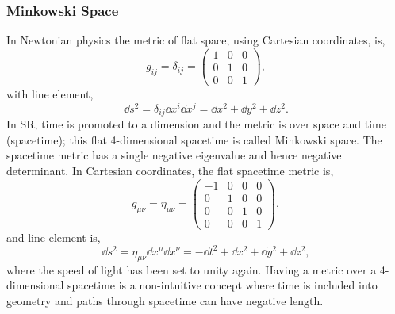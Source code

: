 \subsubsection{Minkowski Space}\label{intro:sec:minkowski_space}
In Newtonian physics the metric of flat space, using Cartesian coordinates, is, 
\begin{equation}
g_{ij} = \delta_{ij} = \begin{pmatrix} 1 & 0 & 0 \\ 0 & 1 & 0 \\ 0 & 0 & 1 \end{pmatrix},
\end{equation}
with line element,
\begin{equation}
\dd s ^2 = \delta_{ij} \dd x^i \dd x^j = \dd x^2 + \dd y^2 + \dd z^2.
\end{equation}
In SR, time is promoted to a dimension and the metric is over space and time (spacetime); this flat 4-dimensional spacetime is called Minkowski space. The spacetime metric has a single negative eigenvalue and hence negative determinant. In Cartesian coordinates, the flat spacetime metric is,
\begin{equation}
g_{\mu\nu} = \eta_{\mu\nu} = \begin{pmatrix} -1 &0 &0 &0\\ 0 & 1 & 0 & 0 \\ 0 & 0 & 1 & 0 \\ 0 & 0 & 0 & 1 \end{pmatrix},
\end{equation}
and line element is,
\begin{equation}
\dd s ^2 = \eta_{\mu\nu} \dd x^\mu \dd x^\nu = -\dd t^2 + \dd x^2 + \dd y^2 + \dd z^2,
\end{equation}
where the speed of light has been set to unity again. Having a metric over a 4-dimensional spacetime is a non-intuitive concept where time is included into geometry and paths through spacetime can have negative length.

